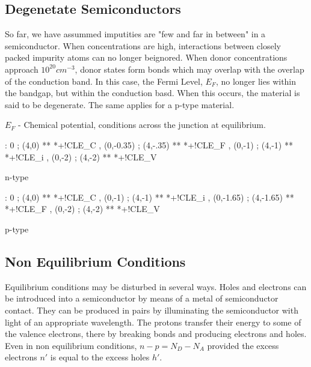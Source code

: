 \documentclass[a4paper,12pt]{article}
\begin{document}
\subsection{Degenetate Semiconductors}

So far, we have assummed imputities are "few and far in between" in a
semiconductor. When concentrations are high, interactions between
closely packed impurity atoms can no longer beignored. When donor
concentrations approach $10^{20} cm^{-3}$, donor states form bonds which
may overlap with the overlap of the conduction band. In this case, the
Fermi Level, $E_{F}$, no longer lies within the bandgap, but within the
conduction basd. When this occurs, the material is said to be
degenerate. The same applies for a p-type material.

$E_{F}$ - Chemical potential, conditions across the junction
at equilibrium.

\begin{table}[hbtp]

\xy <1cm,0cm>:
0 ; (4,0) **\dir{-} *+!CL{E_C} ,
(0,-0.35) ; (4,-.35) **\dir{-} *+!CL{E_F} ,
(0,-1) ; (4,-1) **\dir{--} *+!CL{E_i}  ,
(0,-2) ; (4,-2) **\dir{-} *+!CL{E_V}
\endxy

\caption{n-type}

\end{table}

\begin{table}[hbtp]

\xy <1cm,0cm>:
0 ; (4,0) **\dir{-} *+!CL{E_C} ,
(0,-1) ; (4,-1) **\dir{--} *+!CL{E_i}  ,
(0,-1.65) ; (4,-1.65) **\dir{-} *+!CL{E_F} ,
(0,-2) ; (4,-2) **\dir{-} *+!CL{E_V}
\endxy

\caption{p-type}

\end{table}

\subsection{Non Equilibrium Conditions}

Equilibrium conditions may be disturbed in several ways. Holes and
electrons can be introduced into a semiconductor by means of a metal of
semiconductor contact. They can be produced in pairs by illuminating the
semiconductor with light of an appropriate wavelength. The protons
transfer their energy to some of the valence electrons, there by
breaking bonds and producing electrons and holes. Even in non
equilibrium conditions, $n - p = N_{D} - N_{A}$ provided the excess
electrons $n'$ is equal to the excess holes $h'$.
\end{document}
